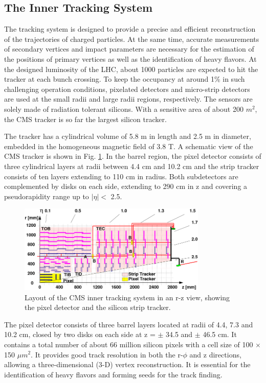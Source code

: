 \documentclass[thesis.tex]{subfiles}
\begin{document}
\subsection{The Inner Tracking System}
The tracking system is designed to provide a precise and efficient reconstruction of the trajectories of charged particles. 
At the same time, accurate measurements of secondary vertices and impact parameters are necessary for the estimation of the positions of primary vertices as well as the identification of heavy flavors. 
At the designed luminosity of the LHC, about 1000 particles are expected to hit the tracker at each bunch crossing. 
To keep the occupancy at around 1\% in such challenging operation conditions, pixelated detectors and micro-strip detectors are used at the small radii and large radii regions, respectively. 
The sensors are solely made of radiation tolerant silicons. With a sensitive area of about 200 $m^2$, the CMS tracker is so far the largest silicon tracker.  

The tracker has a cylindrical volume of 5.8 m in length and 2.5 m in diameter, embedded in the homogeneous magnetic field of 3.8 T. 
A schematic view of the CMS tracker is shown in Fig. \ref{fig:tracker}. 
In the barrel region, the pixel detector consists of three cylindrical layers at radii between 4.4 cm and 10.2 cm and the strip tracker consists of ten layers extending to 110 cm in radius. 
Both subdetectors are complemented by disks on each side, extending to 290 cm in z and covering a pseudorapidity range up to $|\eta| <$ 2.5. 

\begin{figure}[!htb]
	\centering
	\includegraphics[width=0.8\textwidth]{plot/tracker.png}
	\caption{Layout of the CMS inner tracking system in an r-z view, showing the pixel detector and the silicon strip tracker.}
	\label{fig:tracker}
\end{figure}


The pixel detector consists of three barrel layers located at radii of 4.4, 7.3 and 10.2 cm, closed by two disks on each side at z = $\pm$ 34.5 and $\pm$ 46.5 cm. 
It contains a total number of about 66 million silicon pixels with a cell size of 100 $\times$150 $\mu m^2$. 
It provides good track resolution in both the r-$\phi$ and z directions, allowing a three-dimensional (3-D) vertex reconstruction. 
It is essential for the identification of heavy flavors and forming seeds for the track finding.
\end{document}
